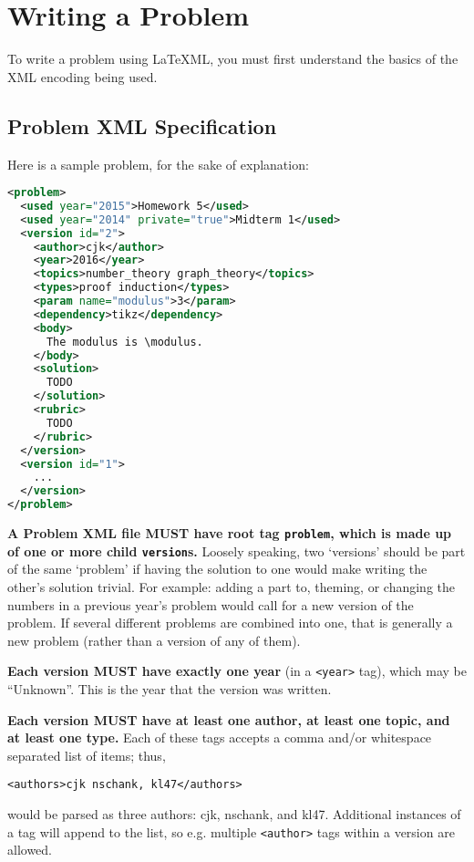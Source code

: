 \section{Writing a Problem}
  To write a problem using \LaTeX ML, you must first understand the basics of the XML encoding being used.
  
  \subsection{Problem XML Specification}
    Here is a sample problem, for the sake of explanation:
    \begin{mdframed}
      \begin{lstlisting}[language=XML,columns=fullflexible,breaklines=true]
<problem>
  <used year="2015">Homework 5</used>
  <used year="2014" private="true">Midterm 1</used>
  <version id="2">
    <author>cjk</author>
    <year>2016</year>
    <topics>number_theory graph_theory</topics>
    <types>proof induction</types>
    <param name="modulus">3</param>
    <dependency>tikz</dependency>
    <body>
      The modulus is \modulus.
    </body>
    <solution>
      TODO
    </solution>
    <rubric>
      TODO
    </rubric>
  </version>
  <version id="1">
    ...
  </version>
</problem>
      \end{lstlisting}
    \end{mdframed}
    
    \textbf{A Problem XML file MUST have root tag \texttt{problem}, which is made up of one or more child \texttt{version}s.} Loosely speaking, two `versions' should be part of the same `problem' if having the solution to one would make writing the other's solution trivial. For example: adding a part to, theming, or changing the numbers in a previous year's problem would call for a new version of the problem. If several different problems are combined into one, that is generally a new problem (rather than a version of any of them).
    
    \textbf{Each version MUST have exactly one year} (in a \texttt{<year>} tag), which may be ``Unknown''. This is the year that the version was written.
    
    \textbf{Each version MUST have at least one author, at least one topic, and at least one type.} Each of these tags accepts a comma and/or whitespace separated list of items; thus,
    \begin{center}
      \texttt{<authors>cjk nschank, kl47</authors>}
    \end{center}
    would be parsed as three authors: cjk, nschank, and kl47. Additional instances of a tag will append to the list, so e.g. multiple \texttt{<author>} tags within a version are allowed.
    
